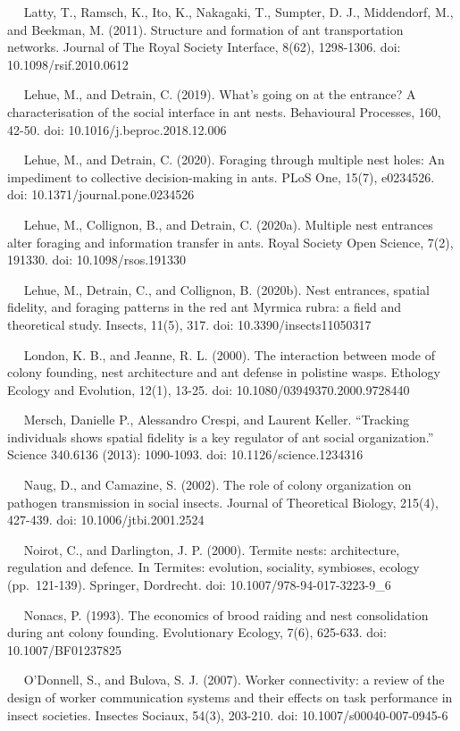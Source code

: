 \documentclass[3p]{elsarticle} %
\begin{document}
~~ Latty, T., Ramsch, K., Ito, K., Nakagaki, T., Sumpter, D. J.,
Middendorf, M., and Beekman, M. (2011). Structure and formation of ant
transportation networks. Journal of The Royal Society Interface, 8(62),
1298-1306. doi: 10.1098/rsif.2010.0612

~~ Lehue, M., and Detrain, C. (2019). What's going on at the entrance? A
characterisation of the social interface in ant nests. Behavioural
Processes, 160, 42-50. doi: 10.1016/j.beproc.2018.12.006

~~ Lehue, M., and Detrain, C. (2020). Foraging through multiple nest
holes: An impediment to collective decision-making in ants. PLoS One,
15(7), e0234526. doi: 10.1371/journal.pone.0234526

~~ Lehue, M., Collignon, B., and Detrain, C. (2020a). Multiple nest
entrances alter foraging and information transfer in ants. Royal Society
Open Science, 7(2), 191330. doi: 10.1098/rsos.191330

~~ Lehue, M., Detrain, C., and Collignon, B. (2020b). Nest entrances,
spatial fidelity, and foraging patterns in the red ant Myrmica rubra: a
field and theoretical study. Insects, 11(5), 317. doi:
10.3390/insects11050317

~~ London, K. B., and Jeanne, R. L. (2000). The interaction between mode
of colony founding, nest architecture and ant defense in polistine
wasps. Ethology Ecology and Evolution, 12(1), 13-25. doi:
10.1080/03949370.2000.9728440

~~ Mersch, Danielle P., Alessandro Crespi, and Laurent Keller.
``Tracking individuals shows spatial fidelity is a key regulator of ant
social organization.'' Science 340.6136 (2013): 1090-1093. doi:
10.1126/science.1234316

~~ Naug, D., and Camazine, S. (2002). The role of colony organization on
pathogen transmission in social insects. Journal of Theoretical Biology,
215(4), 427-439. doi: 10.1006/jtbi.2001.2524

~~ Noirot, C., and Darlington, J. P. (2000). Termite nests:
architecture, regulation and defence. In Termites: evolution, sociality,
symbioses, ecology (pp.~121-139). Springer, Dordrecht. doi:
10.1007/978-94-017-3223-9\_6

~~ Nonacs, P. (1993). The economics of brood raiding and nest
consolidation during ant colony founding. Evolutionary Ecology, 7(6),
625-633. doi: 10.1007/BF01237825

~~ O'Donnell, S., and Bulova, S. J. (2007). Worker connectivity: a
review of the design of worker communication systems and their effects
on task performance in insect societies. Insectes Sociaux, 54(3),
203-210. doi: 10.1007/s00040-007-0945-6
\end{document}
